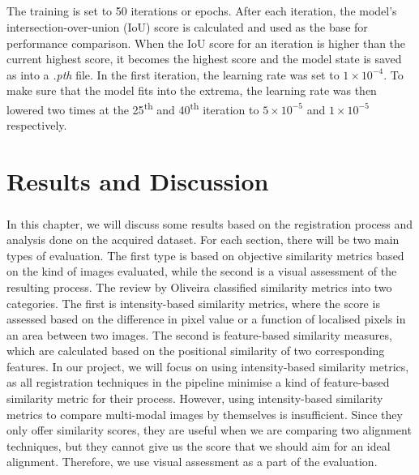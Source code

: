 \documentclass[12pt,oneside]{report}
\begin{document}
\paragraph{}
The training is set to 50 iterations or epochs. After each iteration, the model's intersection-over-union (IoU) score is calculated and used as the base for performance comparison. When the IoU score for an iteration is higher than the current highest score, it becomes the highest score and the model state is saved as into a \textit{.pth} file. In the first iteration, the learning rate was set to $1 \times 10^{-4}$. To make sure that the model fits into the extrema, the learning rate was then lowered two times at the 25\textsuperscript{th} and 40\textsuperscript{th} iteration to $5 \times 10^{-5}$ and $1 \times 10^{-5}$ respectively.


\chapter{Results and Discussion}
\paragraph{}
In this chapter, we will discuss some results based on the registration process and analysis done on the acquired dataset. For each section, there will be two main types of evaluation. The first type is based on objective similarity metrics based on the kind of images evaluated, while the second is a visual assessment of the resulting process. The review by Oliveira \cite{oliveira_medical_2014} classified similarity metrics into two categories. The first is intensity-based similarity metrics, where the score is assessed based on the difference in pixel value or a function of localised pixels in an area between two images. The second is feature-based similarity measures, which are calculated based on the positional similarity of two corresponding features. In our project, we will focus on using intensity-based similarity metrics, as all registration techniques in the pipeline minimise a kind of feature-based similarity metric for their process. However, using intensity-based similarity metrics to compare multi-modal images by themselves is insufficient. Since they only offer similarity scores, they are useful when we are comparing two alignment techniques, but they cannot give us the score that we should aim for an ideal alignment. Therefore, we use visual assessment as a part of the evaluation.
\end{document}
